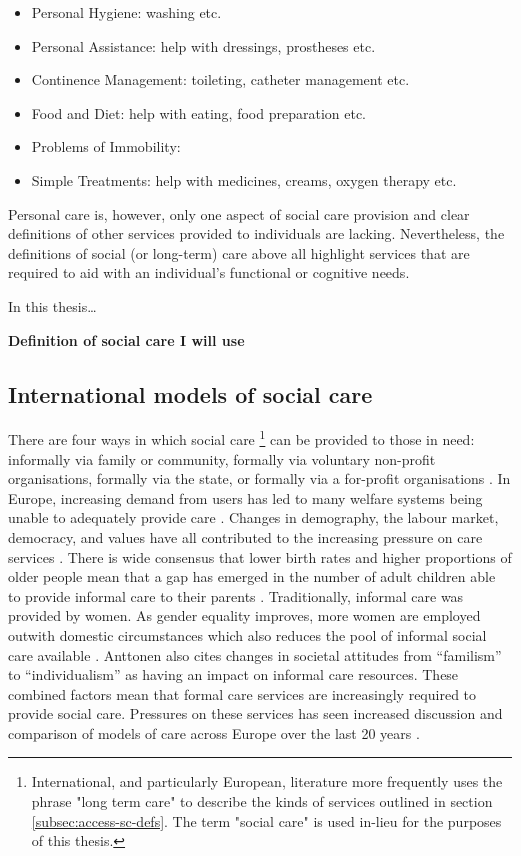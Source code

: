 \documentclass[12pt,]{report}
\let\rmarkdownfootnote\footnote%
\def\footnote{\protect\rmarkdownfootnote}
\begin{document}
\begin{itemize}[noitemsep]
\item Personal Hygiene: washing etc.  
\item Personal Assistance: help with dressings, prostheses etc.  
\item Continence Management: toileting, catheter management etc.  
\item Food and Diet: help with eating, food preparation etc.  
\item Problems of Immobility:  
\item Simple Treatments: help with medicines, creams, oxygen therapy etc. 
\end{itemize}

Personal care is, however, only one aspect of social care provision and
clear definitions of other services provided to individuals are lacking.
Nevertheless, the definitions of social (or long-term) care above all
highlight services that are required to aid with an individual's
functional or cognitive needs.

In this thesis\ldots{}

\textbf{Definition of social care I will use}

\subsection{International models of social care}\label{subsec:access-sc-models}

There are four ways in which social care
\footnote{International, and particularly European, literature more frequently uses the phrase "long term care" to describe the kinds of services outlined in section \ref{subsec:access-sc-defs}. The term "social care" is used in-lieu for the purposes of this thesis.}
can be provided to those in need: informally via family or community,
formally via voluntary non-profit organisations, formally via the state,
or formally via a for-profit organisations \citep{RN346}. In Europe,
increasing demand from users has led to many welfare systems being
unable to adequately provide care \citep{RN344, RN414}. Changes in
demography, the labour market, democracy, and values have all
contributed to the increasing pressure on care services
\citep{RN406, RN342, RN414}. There is wide consensus that lower birth
rates and higher proportions of older people mean that a gap has emerged
in the number of adult children able to provide informal care to their
parents \citep{RN342, RN343, RN344, RN346, RN345, RN414}. Traditionally,
informal care was provided by women. As gender equality improves, more
women are employed outwith domestic circumstances which also reduces the
pool of informal social care available \citep{RN342}. Anttonen
\citeyearpar{RN342} also cites changes in societal attitudes from
``familism'' to ``individualism'' as having an impact on informal care
resources. These combined factors mean that formal care services are
increasingly required to provide social care. Pressures on these
services has seen increased discussion and comparison of models of care
across Europe over the last 20 years \citep{RN347, RN348, RN346, RN349}.
\end{document}
